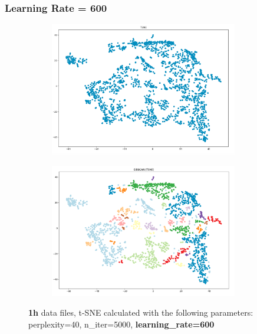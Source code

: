 \subsubsection{Learning Rate = 600}
\begin{figure}[H]
  \centering
  \begin{subfigure}{.5\textwidth}
    \centering
    \includegraphics[width=0.9\textwidth]{./images/tsneParametersTest/learningRate/lr600-1hTSNE.png}
  \end{subfigure}%
  \begin{subfigure}{.5\textwidth}
    \centering
    \includegraphics[width=0.9\textwidth]{./images/tsneParametersTest/learningRate/lr600-1hDBSCAN.png}
  \end{subfigure}
	\caption{\textbf{1h} data files, t-SNE calculated with the following parameters: perplexity=40, n\_iter=5000, \textbf{learning\_rate=600}}
	\label{figure:1hlr600TSNE}
\end{figure}

